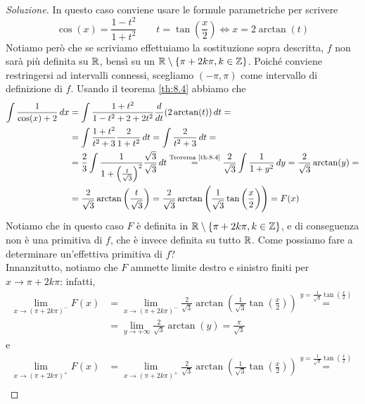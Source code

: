 \begin{proof}[Soluzione]
    In questo caso conviene usare le formule parametriche per scrivere
    \[
    \cos(x)=\frac{1-t^2}{1+t^2} \qquad t = \tan\left(\frac{x}{2}\right)\iff x = 2\arctan(t)
    \]
    Notiamo però che se scriviamo effettuiamo la sostituzione sopra descritta, $f$ non sarà più definita su $\amsbb{R}$, bensì su un $\amsbb{R}\setminus\{\pi+2k\pi, k\in\amsbb{Z}\}$. Poiché conviene restringersi ad intervalli connessi, scegliamo $(-\pi, \pi)$ come intervallo di definizione di $f$. Usando il teorema \ref{th:8.4} abbiamo che
    \[
    \begin{split}
        \int \frac{1}{\cos(x)+2}\, dx & = \int \frac{1+t^2}{1-t^2+2+2t^2}\frac{d}{dt}(2\arctan(t))\, dt = \\
        & = \int \frac{1+t^2}{t^2+3}\frac{2}{1+t^2}\, dt = \int \frac{2}{t^2+3}\, dt  =\\
        & = \frac{2}{3}\int \frac{1}{1+\left(\frac{t}{\sqrt{3}}\right)^2}\frac{\sqrt{3}}{\sqrt{3}}\, dt \overset{\text{Teorema \ref{th:8.4}}}{=} \frac{2}{\sqrt{3}}\int \frac{1}{1+y^2}\, dy = \frac{2}{\sqrt{3}}\arctan(y) =\\
        & = \frac{2}{\sqrt{3}}\arctan\left(\frac{t}{\sqrt{3}}\right) = \frac{2}{\sqrt{3}}\arctan\left(\frac{1}{\sqrt{3}}\tan\left(\frac{x}{2}\right)\right) = F(x)
    \end{split}
    \]
    Notiamo che in questo caso $F$ è definita in $\amsbb{R}\setminus\{\pi+2k\pi, k\in\amsbb{Z}\}$, e di conseguenza non è una primitiva di $f$, che è invece definita su tutto $\amsbb{R}$. Come possiamo fare a determinare un'effettiva primitiva di $f$?\\
    Innanzitutto, notiamo che $F$ ammette limite destro e sinistro finiti per $x\to \pi+2k\pi$: infatti,
    \[
    \begin{split}
        \lim_{x\to (\pi+2k\pi)^-} F(x) & = \lim_{x\to (\pi+2k\pi)^-}\frac{2}{\sqrt{3}}\arctan\left(\frac{1}{\sqrt{3}}\tan\left(\frac{x}{2}\right)\right) \overset{y=\frac{1}{\sqrt{3}}\tan\left(\frac{x}{2}\right)}{=} \\
        & = \lim_{y\to +\infty} \frac{2}{\sqrt{3}}\arctan(y) = \frac{\pi}{\sqrt{3}}
    \end{split}
    \]
    e
    \[
    \begin{split}
        \lim_{x\to (\pi+2k\pi)^+} F(x) & = \lim_{x\to (\pi+2k\pi)^+}\frac{2}{\sqrt{3}}\arctan\left(\frac{1}{\sqrt{3}}\tan\left(\frac{x}{2}\right)\right) \overset{y=\frac{1}{\sqrt{3}}\tan\left(\frac{x}{2}\right)}{=} \\

\end{split}\]
\end{proof}
